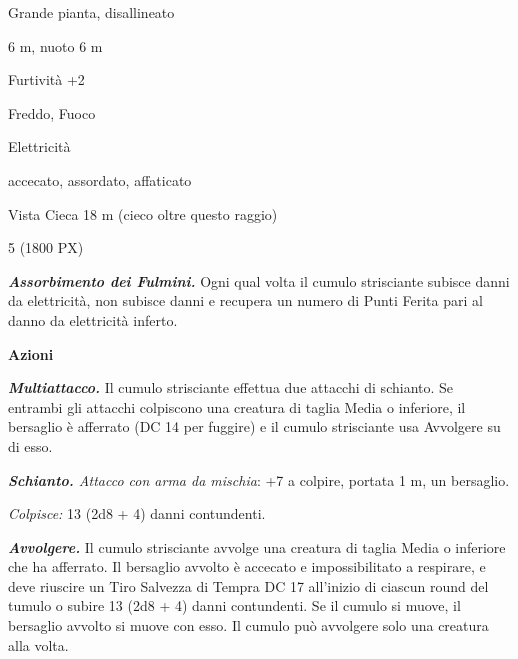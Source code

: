 \begin{multicols}{2}
{
\begin{description}[noitemsep, topsep=0pt, parsep=0pt, partopsep=0pt, itemsep=1pt, leftmargin=2.35cm,  labelwidth=2.2cm, itemindent=0cm, listparindent=0pt] %
\setlength{\baselineskip}{10pt}
\item[\textbf{Taglia/Tipo}] Grande pianta, disallineato
\item[\textbf{Caratt.}] 
\item[\textbf{Punti Ferita}] 
\item[\textbf{Movimento}] 6 m, nuoto 6 m
\item[\textbf{Tiri Salvez.}] 
\item[\textbf{Comp.}] Furtività +2
\item[\textbf{Res. Danni}] Freddo, Fuoco
\item[\textbf{Imm. Danni}] Elettricità
\item[\textbf{Immunità}] accecato, assordato, affaticato
\item[\textbf{Sensi}] Vista Cieca 18 m (cieco oltre questo raggio)
\item[\textbf{Sfida}] 5 (1800 PX)
\end{description}
\smallskip

\emph{\textbf{Assorbimento dei Fulmini.}} Ogni qual volta il cumulo strisciante subisce danni da elettricità, non subisce danni e recupera un numero di Punti Ferita pari al danno da elettricità inferto.

\textbf{Azioni}

\emph{\textbf{Multiattacco.}} Il cumulo strisciante effettua due attacchi di schianto. Se entrambi gli attacchi colpiscono una creatura di taglia Media o inferiore, il bersaglio è afferrato (DC 14 per fuggire) e il cumulo strisciante usa Avvolgere su di esso.

\emph{\textbf{Schianto.} Attacco con arma da mischia}: +7 a colpire, portata 1 m, un bersaglio.

\emph{Colpisce:} 13 (2d8 + 4) danni contundenti.

\emph{\textbf{Avvolgere.}} Il cumulo strisciante avvolge una creatura di taglia Media o inferiore che ha afferrato. Il bersaglio avvolto è accecato e impossibilitato a respirare, e deve riuscire un Tiro Salvezza di Tempra DC 17 all'inizio di ciascun round del tumulo o subire 13 (2d8 + 4) danni contundenti. Se il cumulo si muove, il bersaglio avvolto si muove con esso. Il cumulo può avvolgere solo una creatura alla volta.

}
\end{multicols}
